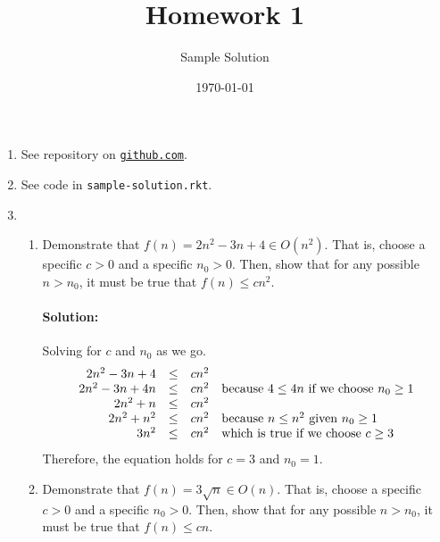 \documentclass{article}
\title{Homework 1}
\author{Sample Solution}
\date{\today}
\begin{document}
\maketitle

\newcommand\link[2][http://]{\href{#1#2}{\nolinkurl{#2}}}
\newcommand\http[1]{\link[http://]{#1}}
\newcommand\https[1]{\link[https://]{#1}}
\newcommand\email[1]{\link[mailto:]{#1}}

\begin{enumerate}

\pagebreak[1]
\item See repository on \link{github.com}.

\pagebreak[1]
\item See code in \texttt{sample-solution.rkt}.

\pagebreak[1]
\item

  \begin{enumerate}

  \item Demonstrate that
    \(f(n) = 2n^2 - 3n + 4 \in O(n^2)\).
    That is, choose a specific \(c>0\) and a specific \(n_0 > 0\).
    Then, show that for any possible \(n > n_0\), it must be true that
    \(f(n) \leq c n^2\).

    \paragraph{Solution:} Solving for \(c\) and \(n_0\) as we go.
    \[
    \begin{array}{rcll}
      2n^2 - 3n + 4 &\leq& cn^2 \\
      2n^2 - 3n + 4n &\leq& cn^2
      & $because $ 4 \leq 4n $ if we choose $ n_0 \geq 1 \\
      2n^2 + n &\leq& cn^2 \\
      2n^2 + n^2 &\leq& cn^2
      & $because $ n \leq n^2 $ given $ n_0 \geq 1 \\
      3n^2 &\leq& cn^2
      & $which is true if we choose $ c \geq 3
    \end{array}
    \]
    Therefore, the equation holds for \(c=3\) and \(n_0=1\).

    \bigskip

  \item Demonstrate that
    \(f(n) = 3 \sqrt{n} \in O(n)\).
    That is, choose a specific \(c>0\) and a specific \(n_0 > 0\).
    Then, show that for any possible \(n > n_0\), it must be true that
    \(f(n) \leq c n\).


\end{enumerate}
\end{enumerate}
\end{document}
